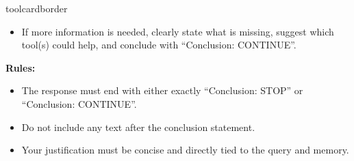\begin{custombox}[title=Instruction for {Execution Verifier}]{toolcardborder}
\begin{itemize}[left=0pt, label={}, itemsep=0pt, parsep=0pt]
\item If more information is needed, clearly state what is missing, suggest which tool(s) could help, and conclude with {``Conclusion: CONTINUE''}.
\end{itemize}

\vspace{6pt}

\noindent\textbf{Rules:}
\begin{itemize}[left=0pt, label={}, itemsep=0pt, parsep=0pt]
\item The response must end with either {exactly} ``Conclusion: STOP'' or ``Conclusion: CONTINUE''.
    
\item Do not include any text after the conclusion statement.
    
\item Your justification must be concise and directly tied to the query and memory.
\end{itemize}
\end{custombox}

